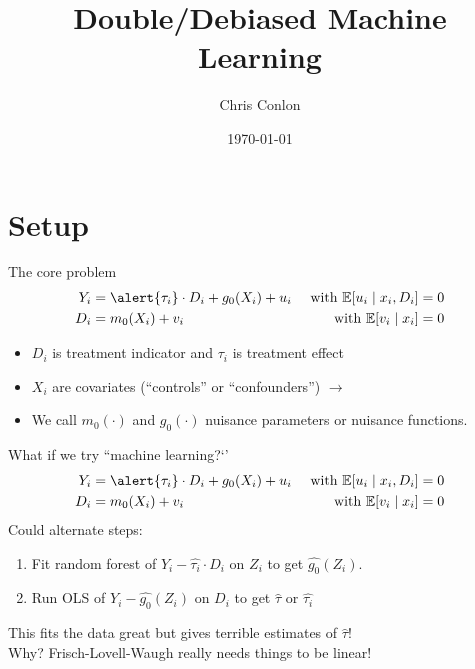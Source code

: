 


\title{ Double/Debiased Machine Learning}
\author{Chris Conlon }



\date{\today}


\maketitle

\section*{Setup}

\begin{frame}{The core problem}
\begin{align*}
Y_i &= \alert{\tau_i} \cdot D_i + g_0(X_i) + u_i &\text{ with }\E[u_i \mid x_i, D_i]=0\\
D_i &= m_0(X_i) + v_i &\text{ with } \E[v_i \mid x_i ]=0
\end{align*}
\begin{itemize}
    \item $D_i$ is \alert{treatment indicator} and $\tau_i$  is \alert{treatment effect}
    \item $X_i$ are covariates (``controls'' or ``confounders'') $\rightarrow$
    \item We call $m_0(\cdot)$ and $g_0(\cdot)$ \alert{nuisance parameters} or \alert{nuisance functions}.
\end{itemize}
\end{frame}

\begin{frame}{What if we try ``machine learning?`'}
\begin{align*}
Y_i &= \alert{\tau_i} \cdot D_i + g_0(X_i) + u_i &\text{ with }\E[u_i \mid x_i, D_i]=0\\
D_i &= m_0(X_i) + v_i &\text{ with } \E[v_i \mid x_i ]=0
\end{align*}
Could alternate steps:
\begin{enumerate}
    \item Fit random forest of $Y_i - \widehat{\tau_i} \cdot D_i$ on $Z_i$ to get $\widehat{g_0}(Z_i)$.
    \item Run OLS of $Y_i - \widehat{g_0}(Z_i)$ on $D_i$ to get $\widehat{\tau}$ or $\widehat{\tau_i}$
\end{enumerate}
This fits the data great but gives terrible estimates of $\widehat{\tau}$!\\
Why? Frisch-Lovell-Waugh really needs things to be \alert{linear}!
\end{frame}

